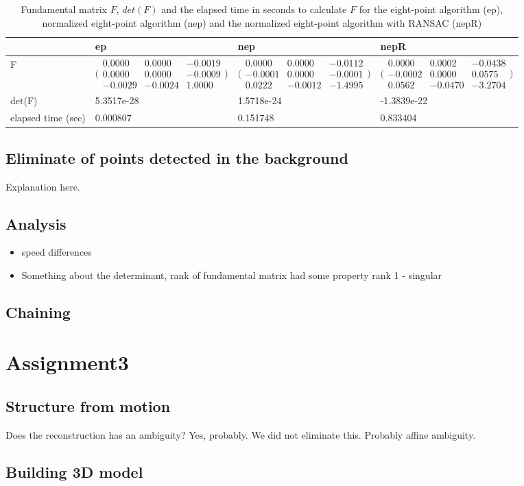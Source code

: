 \documentclass[12pt]{amsart}
\begin{document}
\begin{table}
    \begin{tabular}{l|l|l|l}
    ~                  & ep & nep & nepR \\ \hline
    F                  
    & $\bigl(\begin{smallmatrix}0.0000&0.0000&-0.0019\\ 0.0000&0.0000&-0.0009\\-0.0029&-0.0024&1.0000\end{smallmatrix} \bigr)$ 
    & $\bigl(\begin{smallmatrix}0.0000&0.0000&-0.0112\\ -0.0001&0.0000&-0.0001\\0.0222&-0.0012&-1.4995\end{smallmatrix} \bigr)$                      
    & $\bigl(\begin{smallmatrix}0.0000&0.0002&-0.0438\\ -0.0002&0.0000&0.0575\\0.0562&-0.0470&-3.2704\end{smallmatrix} \bigr)$                                  \\ \hline
    det(F)             & 5.3517e-28  & 1.5718e-24             & -1.3839e-22                        \\ \hline
    elapsed time (sec) & 0.000807    & 0.151748               & 0.833404                           \\
    \end{tabular}
    \label{fund}
    \caption{Fundamental matrix $F$, $\textit{det}(F)$ and the elapsed time in seconds to calculate $F$ for the eight-point algorithm (ep), normalized eight-point algorithm (nep) and the normalized eight-point algorithm with RANSAC (nepR)}
\end{table}
\subsection{Eliminate of points detected in the background}
\label{background}
Explanation here.
\subsection{Analysis}
\begin{itemize}
\item speed differences
\item Something about the determinant, rank of fundamental matrix had some property rank 1 - singular
\end{itemize}
\subsection{Chaining}
\section{Assignment3}
\subsection{Structure from motion}
Does the reconstruction has an ambiguity? Yes, probably. We did not eliminate this. Probably affine ambiguity. 
\subsection{Building 3D model}
\end{document}
